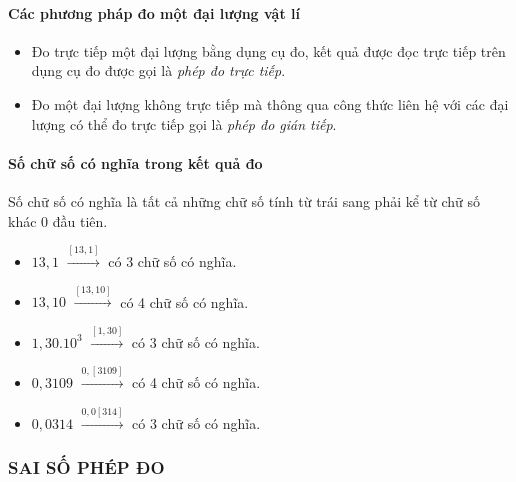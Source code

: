 \paragraph{Các phương pháp đo một đại lượng vật lí}
\begin{itemize}
\item Đo trực tiếp một đại lượng bằng dụng cụ đo, kết quả được đọc trực tiếp trên dụng cụ đo được gọi là \textit{phép đo trực tiếp}.
\item Đo một đại lượng không trực tiếp mà thông qua công thức liên hệ với các đại lượng có thể đo trực tiếp gọi là \textit{phép đo gián tiếp}.
\end{itemize}

\paragraph{Số chữ số có nghĩa trong kết quả đo}
Số chữ số có nghĩa là tất cả những chữ số tính từ trái sang phải kể từ chữ số khác 0 đầu tiên.
\begin{itemize}
\item $13,1$ $\xrightarrow{[13,1]}$ có 3 chữ số có nghĩa.
\item $13,10$ $\xrightarrow{[13,10]}$ có 4 chữ số có nghĩa.
\item $1,30.10^3$ $\xrightarrow{[1,30]}$ có 3 chữ số có nghĩa.
\item $0,3109$ $\xrightarrow{0,[3109]}$ có 4 chữ số có nghĩa.
\item $0,0314$ $\xrightarrow{0,0[314]}$ có 3 chữ số có nghĩa.
\end{itemize}
\subsubsection{SAI SỐ PHÉP ĐO}
\setcounter{paragraph}{0}
